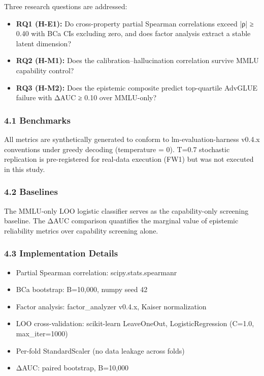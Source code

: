 
Three research questions are addressed:

\begin{itemize}
\item \textbf{RQ1 (H-E1):} Do cross-property partial Spearman correlations exceed |ρ| ≥ 0.40 with BCa CIs excluding zero, and does factor analysis extract a stable latent dimension?
\item \textbf{RQ2 (H-M1):} Does the calibration–hallucination correlation survive MMLU capability control?
\item \textbf{RQ3 (H-M2):} Does the epistemic composite predict top-quartile AdvGLUE failure with ΔAUC ≥ 0.10 over MMLU-only?
\end{itemize}

\subsubsection{4.1 Benchmarks}

All metrics are synthetically generated to conform to lm-evaluation-harness v0.4.x conventions under greedy decoding (temperature = 0). T=0.7 stochastic replication is pre-registered for real-data execution (FW1) but was not executed in this study.

\subsubsection{4.2 Baselines}

The MMLU-only LOO logistic classifier serves as the capability-only screening baseline. The ΔAUC comparison quantifies the marginal value of epistemic reliability metrics over capability screening alone.

\subsubsection{4.3 Implementation Details}

\begin{itemize}
\item Partial Spearman correlation: scipy.stats.spearmanr
\item BCa bootstrap: B=10,000, numpy seed 42
\item Factor analysis: factor_analyzer v0.4.x, Kaiser normalization
\item LOO cross-validation: scikit-learn LeaveOneOut, LogisticRegression (C=1.0, max_iter=1000)
\item Per-fold StandardScaler (no data leakage across folds)
\item ΔAUC: paired bootstrap, B=10,000
\end{itemize}

